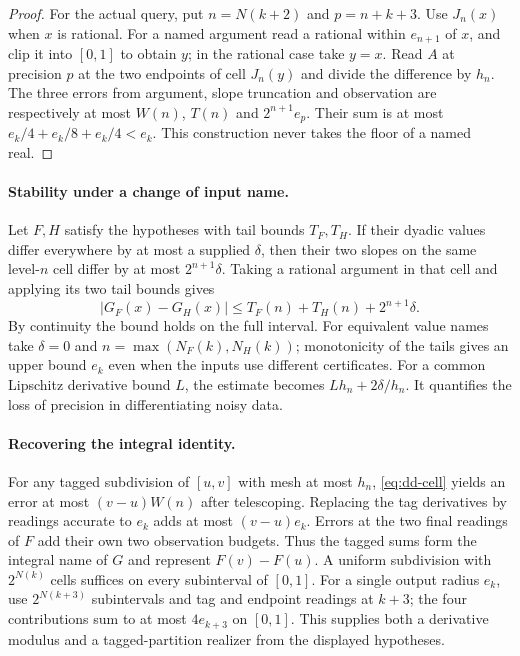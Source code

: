 \begin{proof}
For the actual query, put $n=N(k+2)$ and $p=n+k+3$. Use $J_n(x)$ when $x$ is rational. For a named argument read a rational within $e_{n+1}$ of $x$, and clip it into $[0,1]$ to obtain $y$; in the rational case take $y=x$. Read $A$ at precision $p$ at the two endpoints of cell $J_n(y)$ and divide the difference by $h_n$. The three errors from argument, slope truncation and observation are respectively at most $W(n)$, $T(n)$ and $2^{n+1}e_p$. Their sum is at most $e_k/4+e_k/8+e_k/4<e_k$. This construction never takes the floor of a named real.
\end{proof}

\paragraph{Stability under a change of input name.}
Let $F,H$ satisfy the hypotheses with tail bounds $T_F,T_H$. If their dyadic values differ everywhere by at most a supplied $\delta$, then their two slopes on the same level-$n$ cell differ by at most $2^{n+1}\delta$. Taking a rational argument in that cell and applying its two tail bounds gives
\[
 |G_F(x)-G_H(x)|\le T_F(n)+T_H(n)+2^{n+1}\delta .
\]
By continuity the bound holds on the full interval. For equivalent value names take $\delta=0$ and $n=\max(N_F(k),N_H(k))$; monotonicity of the tails gives an upper bound $e_k$ even when the inputs use different certificates. For a common Lipschitz derivative bound $L$, the estimate becomes $Lh_n+2\delta/h_n$. It quantifies the loss of precision in differentiating noisy data.

\paragraph{Recovering the integral identity.}
For any tagged subdivision of $[u,v]$ with mesh at most $h_n$, \eqref{eq:dd-cell} yields an error at most $(v-u)W(n)$ after telescoping. Replacing the tag derivatives by readings accurate to $e_k$ adds at most $(v-u)e_k$. Errors at the two final readings of $F$ add their own two observation budgets. Thus the tagged sums form the integral name of $G$ and represent $F(v)-F(u)$. A uniform subdivision with $2^{N(k)}$ cells suffices on every subinterval of $[0,1]$. For a single output radius $e_k$, use $2^{N(k+3)}$ subintervals and tag and endpoint readings at $k+3$; the four contributions sum to at most $4e_{k+3}$ on $[0,1]$. This supplies both a derivative modulus and a tagged-partition realizer from the displayed hypotheses.

